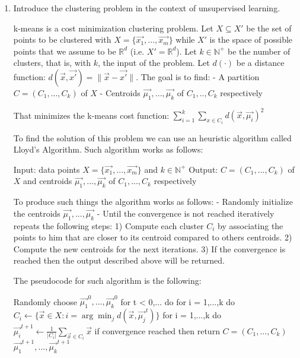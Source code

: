\documentclass[a4paper,11pt,oneside]{book}
\begin{document}
    \begin{enumerate}
        \item Introduce the clustering problem in the context of unsupervised learning.
            \begin{solution}
                k-means is a cost minimization clustering problem. Let $X \subseteq X'$ be the set of points to be clustered with $X = \{\vec{x_1},...,\vec{x_m}\}$ while $X'$ is the space of possible points that we assume to be $\mathbb{R}^d$ (i.e. $X' = \mathbb{R}^d$).
                Let $k \in \mathbb{N}^+$ be the number of clusters, that is, with $k$, the input of the problem.
                Let $d(\cdot)$ be a distance function: $d(\vec{x},\vec{x'}) = \|\vec{x}-\vec{x'}\|$.
                The goal is to find:
                - A partition $C = (C_1,...,C_k)$ of $X$
                - Centroids $\vec{\mu_1},...,\vec{\mu_k}$ of $C_1,..,C_k$ respectively
                
                That minimizes the k-means cost function: $\sum_{i=1}^k \sum_{x\in C_i} d(\vec{x},\vec{\mu_i})^2$
                
                To find the solution of this problem we can use an heuristic algorithm called Lloyd's Algorithm. Such algorithm works as follows:
                
                Input: data points $X = \{\vec{x_1},...,\vec{x_m}\}$ and $k \in \mathbb{N}^+$
                Output: $C = (C_1,...,C_k)$ of $X$ and centroids $\vec{\mu_1},...,\vec{\mu_k}$ of $C_1,...,C_k$ respectively
                
                To produce such things the algorithm works as follows:
                - Randomly initialize the centroids $\vec{\mu_1},...,\vec{\mu_k}$
                - Until the convergence is not reached iteratively repeats the following steps:
                1) Compute each cluster $C_i$ by associating the points to him that are closer to its centroid compared to others centroids.
                2) Compute the new centroids for the next iterations.
                3) If the convergence is reached then the output described above will be returned.
                
                The pseudocode for such algorithm is the following:
                
                Randomly choose $\vec{\mu_1}^0,...,\vec{\mu_k}^0$
                for t < 0,... do
                for i = 1,...,k do $C_i \leftarrow \{\vec{x} \in X : i = \arg\min_j d(\vec{x},\vec{\mu_j}^t)\}$
                for i = 1,...,k do $\vec{\mu_i}^{t+1} \leftarrow \frac{1}{|C_i|}\sum_{\vec{x}\in C_i} \vec{x}$
                if convergence reached then
                    return $C = (C_1,...,C_k)$ $\vec{\mu_1}^{t+1},...,\vec{\mu_k}^{t+1}$
                

\end{solution}
\end{enumerate}
\end{document}

